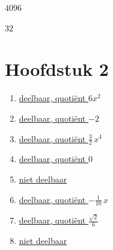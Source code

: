 \documentclass{ximera}
\begin{document}
\begin{Antwoord} \label{antw1.17}
\hyperlink{oef1.17}{$4096$}
\end{Antwoord}

\begin{Antwoord} \label{antw1.18}
\hyperlink{oef1.18}{$32$}
\setcounter{enumi}{0}
\end{Antwoord}


\section*{Hoofdstuk 2}

\begin{Antwoord} \label{antw2.1}
\begin{enumerate}

\item
\hyperlink{oef2.1}{deelbaar, quoti\"ent $6x^2$} 
\item
\hyperlink{oef2.1}{deelbaar, quoti\"ent $-2$}
\item
\hyperlink{oef2.1}{deelbaar, quoti\"ent $\frac{3}{2}\,x^4$}
\item
\hyperlink{oef2.1}{deelbaar, quoti\"ent $0$}
\item
\hyperlink{oef2.1}{niet deelbaar}
\item
\hyperlink{oef2.1}{deelbaar, quoti\"ent $-\frac{1}{10}\,x$}
\item
\hyperlink{oef2.1}{deelbaar, quoti\"ent $\frac{\sqrt{2}}{6}$}
\item
\hyperlink{oef2.1}{niet deelbaar}
\end{enumerate}
\end{Antwoord}
\end{document}
